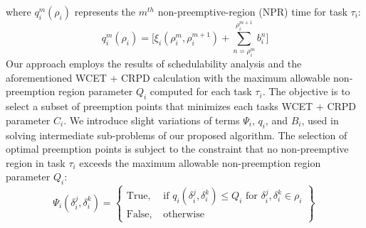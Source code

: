 %
\noindent
where \begin{math}q_{i}^{m}(\rho_{i})\end{math} represents the \begin{math}m^{th}\end{math} non-preemptive-region (NPR) time for task \begin{math}\tau_{i}\end{math}:
\begin{equation}\label{eqn:global-mthnpr-time}
   q_{i}^{m}(\rho_{i}) = \Big[\xi_{i}(\rho_{i}^{m},\rho_{i}^{m+1}) + \sum_{n=\rho_{i}^{m}}^{\rho_{i}^{m+1}}b_{i}^{n}\Big]
\end{equation}
\noindent
Our approach employs the results of schedulability analysis and the aforementioned WCET + CRPD calculation with the maximum allowable non-preemption region parameter \begin{math}Q_{i}\end{math} computed for each task \begin{math}\tau_{i}\end{math}.  The objective is to select a subset of preemption points that minimizes each tasks WCET + CRPD parameter \begin{math}C_{i}\end{math}. We introduce slight variations of terms \begin{math}\Psi_{i}\end{math}, \begin{math}q_{i}\end{math}, and \begin{math}B_{i}\end{math}, used in solving intermediate sub-problems of our proposed algorithm.  The selection of optimal preemption points is subject to the constraint that no non-preemptive region in task \begin{math}\tau_{i}\end{math} exceeds the maximum allowable non-preemption region parameter \begin{math}Q_{i}\end{math}:
\begin{equation}\label{eqn:pp-constraint}
   \Psi_{i}(\delta_{i}^{j},\delta_{i}^{k}) =
\left\{
\begin{array}{lr}
    \textrm{True, }&\textrm{if } q_{i}(\delta_{i}^{j},\delta_{i}^{k}) \leq Q_{i} \textrm{ for } \delta_{i}^{j},\delta_{i}^{k} \in \rho_{i} \\
    \textrm{False, }&\textrm{otherwise}
\end{array}
\right\}~
\end{equation}
